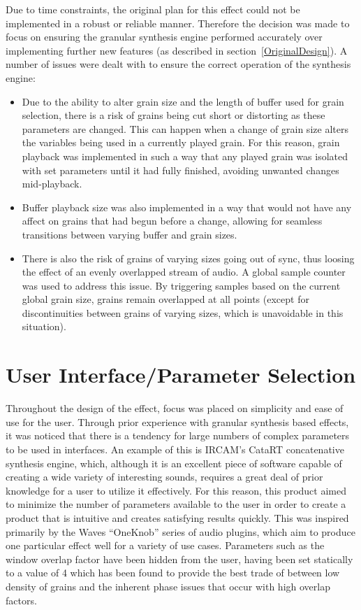 \documentclass[titlepage]{scrartcl}
\begin{document}
Due to time constraints, the original plan for this effect could not be
implemented in a robust or reliable manner. Therefore the decision was made to
focus on ensuring the granular synthesis engine performed accurately over
implementing further new features (as described in section~\ref{OriginalDesign}). A number of
issues were dealt with to ensure the correct operation of the synthesis engine:
\begin{itemize}
    \item Due to the ability to alter grain size and the length of buffer used
        for grain selection, there is a risk of grains being cut short or
        distorting as these parameters are changed. This can happen when a
        change of grain size alters the variables being used in a currently
        played grain. For this reason, grain playback was implemented in such a
        way that any played grain was isolated with set parameters until it had
        fully finished, avoiding unwanted changes mid-playback.
    \item Buffer playback size was also implemented in a way that would not
        have any affect on grains that had begun before a change, allowing for
        seamless transitions between varying buffer and grain sizes.
    \item There is also the risk of grains of varying sizes going out of sync,
        thus loosing the effect of an evenly overlapped stream of audio. A
        global sample counter was used to address this issue. By triggering
        samples based on the current global grain size, grains remain
        overlapped at all points (except for discontinuities between grains of
        varying sizes, which is unavoidable in this situation).
\end{itemize}

\section{User Interface/Parameter Selection}
Throughout the design of the effect, focus was placed on simplicity and ease of
use for the user. Through prior experience with granular synthesis based
effects, it was noticed that there is a tendency for large numbers of complex
parameters to be used in interfaces. An example of this is IRCAM's CataRT
concatenative synthesis engine, which, although it is an excellent piece of
software capable of creating a wide variety of interesting sounds, requires a
great deal of prior knowledge for a user to utilize it effectively. For this
reason, this product aimed to minimize the number of parameters available to the user in
order to create a product that is intuitive and creates satisfying results
quickly. This was inspired primarily by the Waves ``OneKnob'' series of audio
plugins, which aim to produce one particular effect well for a variety of use
cases.
Parameters such as the window overlap factor have been hidden from the user,
having been set statically to a value of 4 which has been found to provide the
best trade of between low density of grains and the inherent phase issues that
occur with high overlap factors.
\end{document}
